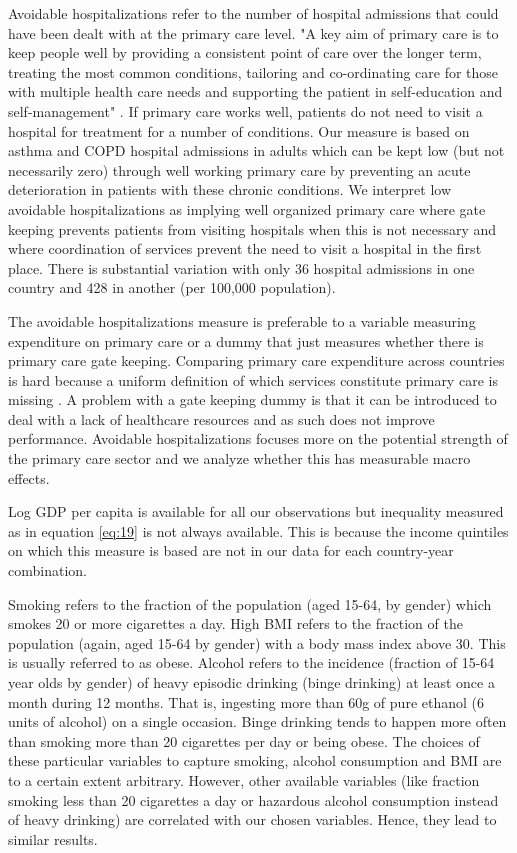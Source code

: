 \documentclass[12pt,english,a4paper]{article}
\begin{document}
Avoidable hospitalizations refer to the number of hospital admissions that could have been dealt with at the primary care level. "A key aim of primary care is to keep people well by providing a consistent point of care over the longer term, treating the most common conditions, tailoring and co-ordinating care for those with multiple health care needs and supporting the patient in self-education and self-management" \citep{OECD_avoidable_hospitalizations}. If primary care works well, patients do not need to visit a hospital for treatment for a number of conditions. Our measure is based on asthma and COPD hospital admissions in adults which can be kept low (but not necessarily zero) through well working primary care by preventing an acute deterioration in patients with these chronic conditions. We interpret low avoidable hospitalizations as implying well organized primary care where gate keeping prevents patients from visiting hospitals when this is not necessary and where coordination of services prevent the need to visit a hospital in the first place. There is substantial variation with only 36 hospital admissions in one country and 428 in another (per 100,000 population).

The avoidable hospitalizations measure is preferable to a variable measuring expenditure on primary care or a dummy that just measures whether there is primary care gate keeping. Comparing primary care expenditure across countries is hard because a uniform definition of which services constitute primary care is missing \citep{OECD_2020}. A problem with a gate keeping dummy is that it can be introduced to deal with a lack of healthcare resources and as such does not improve performance. Avoidable hospitalizations focuses more on the potential strength of the primary care sector and we analyze whether this has measurable macro effects.

Log GDP per capita is available for all our observations but inequality measured as in equation \eqref{eq:19} is not always available. This is because the income quintiles on which this measure is based are not in our data for each country-year combination.

Smoking refers to the fraction of the population (aged 15-64, by gender) which smokes 20 or more cigarettes a day. High BMI refers to the fraction of the population (again, aged 15-64 by gender) with a body mass index above 30. This is usually referred to as obese. Alcohol refers to the incidence (fraction of 15-64 year olds by gender) of heavy episodic drinking (binge drinking) at least once a month during 12 months. That is, ingesting more than 60g of pure ethanol (6 units of alcohol) on a single occasion. Binge drinking tends to happen more often than smoking more than 20 cigarettes per day or being obese. The choices of these particular variables to capture smoking, alcohol consumption and BMI are to a certain extent arbitrary. However, other available variables (like fraction smoking less than 20 cigarettes a day or hazardous alcohol consumption instead of heavy drinking) are correlated with our chosen variables. Hence, they lead to similar results.  
\end{document}
